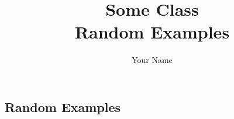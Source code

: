 \documentclass[12pt,a4paper]{report}
\title{\Huge{Some Class}\\Random Examples}
\author{\huge{Your Name}}
\date{}
\begin{document}
\newpage%
\pagebreak

\chapter{}
\section{Random Examples}
\end{document}
